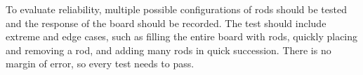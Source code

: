 To evaluate reliability, multiple possible configurations of rods should be tested and the response of the board should be recorded. The test should include extreme and edge cases, such as filling the entire board with rods, quickly placing and removing a rod, and adding many rods in quick succession. There is no margin of error, so every test needs to pass.

























